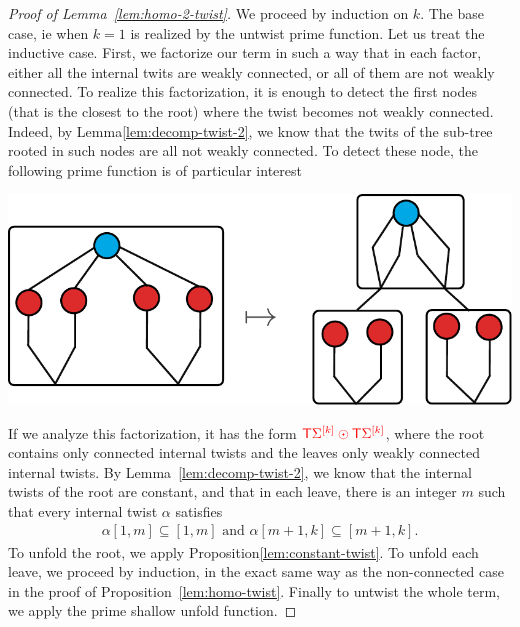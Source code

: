 \begin{proof}[Proof of Lemma~\ref{lem:homo-2-twist}]
We proceed by induction on $k$. The base case, ie when $k=1$ is realized by the untwist prime function. Let us treat the inductive case. First, we factorize our term in such a way that in each factor, either all the internal twits are weakly connected, or all of them are not weakly connected. To realize this factorization, it is enough to detect the first nodes (that is the closest to the root) where the twist becomes not weakly connected. Indeed, by Lemma\ref{lem:decomp-twist-2}, we know that the twits of the sub-tree rooted in such nodes are all not weakly connected. To detect these node, the following prime function is of particular interest
\begin{center}
\includegraphics[scale=.4]{last-prime-function}
\end{center}
If we analyze this factorization, it has the form ${\color{red}{{\color{red}{\mathsf T}}\Sigma^{{\color{red}{[k]}}} \odot {\color{red}{\mathsf T}}\Sigma^{{\color{red}{[k]}}}}}$, where the root contains only connected internal twists and the leaves only weakly connected internal twists. By Lemma~\ref{lem:decomp-twist-2}, we know that the internal twists of the root  are constant, and that in each leave, there is an integer $m$ such that every internal twist $\alpha$ satisfies
\begin{align*}
\alpha[1,m] \subseteq [1,m]  \text{ and } 
\alpha[m+1,k]\subseteq [m+1,k].
\end{align*}
To unfold the root, we apply Proposition\ref{lem:constant-twist}. To unfold each leave, we proceed by induction, in the exact same way as the non-connected case in the proof of Proposition~\ref{lem:homo-twist}. Finally to untwist the whole term, we apply the prime shallow unfold function. 
\end{proof}
